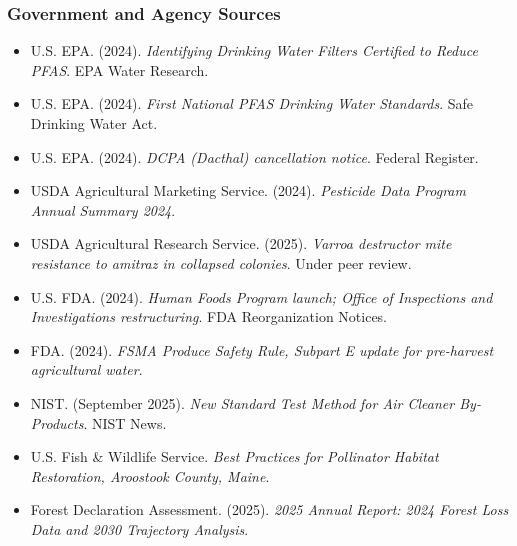 \documentclass[11pt,letterpaper]{article}
\begin{document}
\subsubsection{Government and Agency Sources}
\begin{itemize}[leftmargin=*]
  \item U.S. EPA. (2024). \textit{Identifying Drinking Water Filters Certified to Reduce PFAS}. EPA Water Research.
  \item U.S. EPA. (2024). \textit{First National PFAS Drinking Water Standards}. Safe Drinking Water Act.
  \item U.S. EPA. (2024). \textit{DCPA (Dacthal) cancellation notice}. Federal Register.
  \item USDA Agricultural Marketing Service. (2024). \textit{Pesticide Data Program Annual Summary 2024}.
  \item USDA Agricultural Research Service. (2025). \textit{Varroa destructor mite resistance to amitraz in collapsed colonies}. Under peer review.
  \item U.S. FDA. (2024). \textit{Human Foods Program launch; Office of Inspections and Investigations restructuring}. FDA Reorganization Notices.
  \item FDA. (2024). \textit{FSMA Produce Safety Rule, Subpart E update for pre-harvest agricultural water}.
  \item NIST. (September 2025). \textit{New Standard Test Method for Air Cleaner By-Products}. NIST News.
  \item U.S. Fish \& Wildlife Service. \textit{Best Practices for Pollinator Habitat Restoration, Aroostook County, Maine}.
  \item Forest Declaration Assessment. (2025). \textit{2025 Annual Report: 2024 Forest Loss Data and 2030 Trajectory Analysis}.
\end{itemize}
\end{document}
